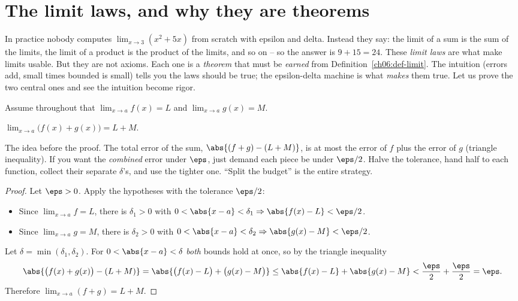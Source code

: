 \section{The limit laws, and why they are theorems}
\label{ch06:laws}

In practice nobody computes $\lim_{x\to 3}(x^2+5x)$ from scratch with epsilon and
delta. Instead they say: the limit of a sum is the sum of the limits, the limit
of a product is the product of the limits, and so on -- so the answer is $9+15 =
24$. These \emph{limit laws} are what make limits usable. But they are not
axioms. Each one is a \emph{theorem} that must be \emph{earned} from
Definition~\ref{ch06:def-limit}. The intuition (errors add, small times bounded
is small) tells you the laws should be true; the epsilon-delta machine is what
\emph{makes} them true. Let us prove the two central ones and see the intuition
become rigor.

Assume throughout that $\lim_{x\to a} f(x) = L$ and $\lim_{x\to a} g(x) = M$.

\begin{theorem}
\label{ch06:thm-sum}
$\displaystyle \lim_{x\to a}\big(f(x)+g(x)\big) = L + M.$
\end{theorem}

\begin{intuitionbox}
The idea before the proof. The total error of the sum, $\abs{(f+g)-(L+M)}$, is at
most the error of $f$ plus the error of $g$ (triangle inequality). If you want
the \emph{combined} error under $\eps$, just demand each piece be under $\eps/2$.
Halve the tolerance, hand half to each function, collect their separate
$\delta$'s, and use the tighter one. ``Split the budget'' is the entire strategy.
\end{intuitionbox}

\begin{proof}
Let $\eps>0$. Apply the hypotheses with the tolerance $\eps/2$:
\begin{itemize}
\item Since $\lim_{x\to a}f=L$, there is $\delta_1>0$ with
  $0<\abs{x-a}<\delta_1 \Rightarrow \abs{f(x)-L}<\eps/2$.
\item Since $\lim_{x\to a}g=M$, there is $\delta_2>0$ with
  $0<\abs{x-a}<\delta_2 \Rightarrow \abs{g(x)-M}<\eps/2$.
\end{itemize}
Let $\delta=\min(\delta_1,\delta_2)$. For $0<\abs{x-a}<\delta$ \emph{both} bounds
hold at once, so by the triangle inequality
\[
  \abs{\big(f(x)+g(x)\big)-(L+M)}
  = \abs{\big(f(x)-L\big)+\big(g(x)-M\big)}
  \le \abs{f(x)-L}+\abs{g(x)-M}
  < \frac{\eps}{2}+\frac{\eps}{2} = \eps.
\]
Therefore $\lim_{x\to a}(f+g)=L+M$.
\end{proof}

